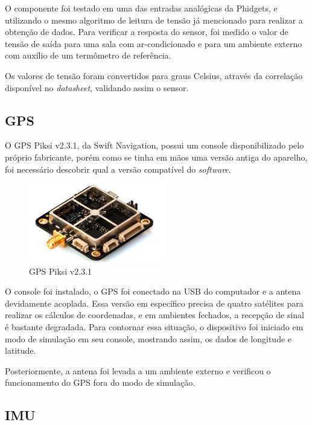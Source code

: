 	    O componente foi testado em uma das entradas analógicas da Phidgets, e utilizando o mesmo algoritmo de leitura de tensão já mencionado para realizar a obtenção de dados. Para verificar a resposta do sensor, foi medido o valor de tensão de saída para uma sala com ar-condicionado e para um ambiente externo com auxílio de um termômetro de referência.
	    
	    Os valores de tensão foram convertidos para graus Celsius, através da correlação disponível no \textit{datasheet}, validando assim o sensor.
    
    \subsection{GPS}
    
	    O GPS Piksi v2.3.1, da Swift Navigation, possui um console disponibilizado pelo próprio fabricante, porém como se tinha em mãos uma versão antiga do aparelho, foi necessário descobrir qual a versão compatível do \textit{software}.
	    
	    \begin{figure}[!ht]
				   \centering
				   \includegraphics[width=6cm]{Figures/gps.jpg}
				   \caption{GPS Piksi v2.3.1}
				   \label{fig:GPS}
		\end{figure}
			    
	     O console foi instalado, o GPS foi conectado na USB do computador e a antena devidamente acoplada. Essa versão em específico precisa de quatro satélites para realizar os cálculos de coordenadas, e em ambientes fechados, a recepção de sinal é bastante degradada. Para contornar essa situação, o dispositivo foi iniciado em modo de simulação em seu console, mostrando assim, os dados de longitude e latitude.
	     
	     Posteriormente, a antena foi levada a um ambiente externo e verificou o funcionamento do GPS fora do modo de simulação.    

	\subsection{IMU}
	    
